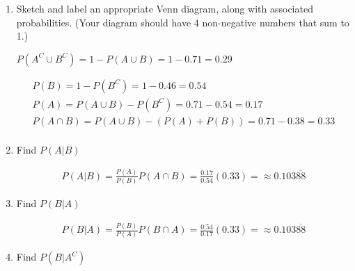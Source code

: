     \begin{enumerate}[label=(\alph*)]
        \item Sketch and label an appropriate Venn diagram, along with associated probabilities. (Your diagram should have 4 non-negative numbers that sum to 1.)
        
        \begin{mdframed}
            \centering
            $P(A^C \cup B^C) = 1 - P(A \cup B) = 1 - 0.71 = 0.29$

            \begin{equation*}
                \begin{gathered}
                    P(B) = 1 - P(B^C) = 1 - 0.46 = 0.54 \\
                    P(A) = P(A \cup B) - P(B^C) = 0.71 - 0.54 = 0.17         \\
                    P(A \cap B) = P(A \cup B) - (P(A) + P(B)) = 0.71 - 0.38 = 0.33  \\
                \end{gathered}
            \end{equation*}

        \end{mdframed}

        \item Find $P(A|B)$

            \begin{mdframed}
                \begin{equation*}
                    \begin{gathered}
                        P(A|B) = \frac{P(A)}{P(B)} P(A \cap B) = \frac{0.17}{0.54}(0.33) = \approx \boxed{0.103\overline{88}}
                    \end{gathered}
                  \end{equation*}    
            \end{mdframed}
              
        \item Find $P(B|A)$
        
            \begin{mdframed}
                \begin{equation*}
                    \begin{gathered}
                        P(B|A) = \frac{P(B)}{P(A)} P(B \cap A) = \frac{0.54}{0.17}(0.33) = \approx \boxed{0.103\overline{88}}
                    \end{gathered}
                \end{equation*}    
            \end{mdframed}

        \item Find $P(B|A^C)$
    \end{enumerate}

